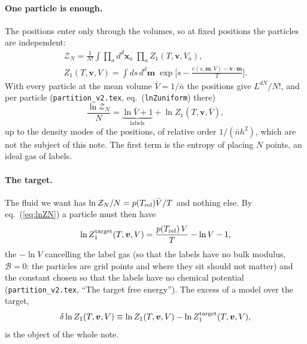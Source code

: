 \documentclass[11pt,aps,preprint,nofootinbib,superscriptaddress,tightenlines]{revtex4-2}
\newcommand{\klab}{\mathcal B}
\def\st{\begin{equation}}
\def\stp{\end{equation}}
\def\Eq#1{eq.~(\ref{#1})}
\let\oldparagraph\paragraph
\renewcommand{\paragraph}{\par\bigskip\oldparagraph}
\begin{document}
\paragraph{One particle is enough.}  The positions enter only through the volumes, so at fixed positions the particles are independent:
\st
\begin{gathered}
\mathcal Z_N=\frac1{N!}\int\prod_ad^d\bm x_a\;\prod_aZ_1(T,\bm v,V_a),\\
Z_1(T,\bm v,V)=\int ds\,d^d\bm m\;\exp\Big[s-\frac{e(s,\bm m,V)-\bm v\cdot\bm m}{T}\Big] .
\end{gathered}
\label{eq:ZN}
\stp
With every particle at the mean volume $\bar V=1/\bar n$ the positions give $L^{dN}/N!$, and per particle (\nolinkurl{partition_v2.tex}, eq.~(\texttt{lnZuniform}) there)
\st
\frac{\ln\mathcal Z_N}{N}=\underbrace{\ln\bar V+1}_{\text{labels}}+\ln Z_1(T,\bm v,\bar V) ,
\label{eq:lnZN}
\stp
up to the density modes of the positions, of relative order $1/(\bar nh^2)$, which are not the subject of this note.  The first term is the
entropy of placing $N$ points, an ideal gas of labels.

\paragraph{The target.}  The fluid we want has $\ln\mathcal Z_N/N=p(T_{\rm rel})\bar V/T$ and nothing else.  By \Eq{eq:lnZN} a particle must
then have
\st
\ln Z_1^{\rm target}(T,\bm v,V)=\frac{p(T_{\rm rel})\,V}{T}-\ln V-1 ,
\label{eq:target}
\stp
the $-\ln V$ cancelling the label gas (so that the labels have no bulk modulus, $\klab=0$: the particles are grid points and where they sit should
not matter) and the constant chosen so that the labels have no chemical potential (\nolinkurl{partition_v2.tex}, ``The target free energy'').  The
excess of a model over the target,
\st
\delta\ln Z_1(T,\bm v,V)\equiv\ln Z_1(T,\bm v,V)-\ln Z_1^{\rm target}(T,\bm v,V) ,
\label{eq:excess}
\stp
is the object of the whole note.
\end{document}
